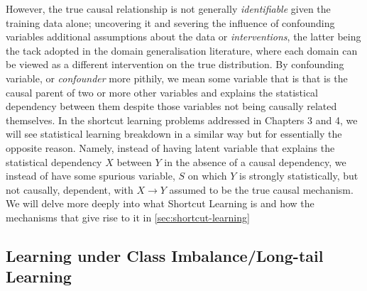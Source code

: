 However, the true causal relationship is not generally \emph{identifiable} given the training data
alone; uncovering it and severing the influence of confounding variables additional assumptions
about the data or \emph{interventions}, the latter being the tack adopted in the domain
generalisation literature, where each domain can be viewed as a different intervention on the true
distribution.
%
By confounding variable, or \emph{confounder} more pithily, we mean some variable that is that is
the causal parent of two or more other variables and explains the statistical dependency between
them despite those variables not being causally related themselves.
%
In the shortcut learning problems addressed in Chapters 3 and 4, we will see statistical learning
breakdown in a similar way but for essentially the opposite reason.
%
Namely, instead of having latent variable that explains the statistical dependency \(X\) between
\(Y\) in the absence of a causal dependency, we instead of have some spurious variable, \(S\) on
which \(Y\) is strongly statistically, but not causally, dependent, with \(X \to Y \) assumed to be
the true causal mechanism.
%
We will delve more deeply into what Shortcut Learning is and how the mechanisms that give rise to
it in \ref{sec:shortcut-learning}

\subsection{Learning under Class Imbalance/Long-tail Learning}

